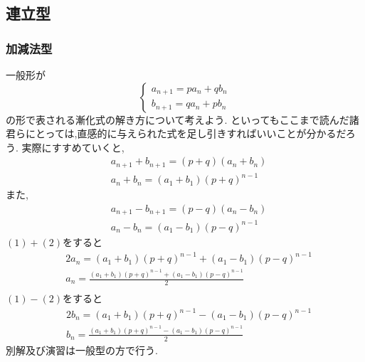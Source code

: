 
\subsection{連立型}\label{節：連立型}
  \subsubsection{加減法型}
    一般形が
    \[
      \begin{cases}
        a_{n+1}=pa_{n}+qb_{n} \\
        b_{n+1}=qa_{n}+pb_{n}
      \end{cases}
    \]
    の形で表される漸化式の解き方について考えよう.
    といってもここまで読んだ諸君らにとっては,直感的に与えられた式を足し引きすればいいことが分かるだろう.
    実際にすすめていくと,
    \begin{align*}
      &a_{n+1}+b_{n+1}=(p+q)(a_{n}+b_{n})\\
      &a_n+b_n=(a_1+b_1)(p+q)^{n-1}\tag*{\(\cdots\) (1)}
    \end{align*}
    また,
    \begin{align*}
      &a_{n+1}-b_{n+1}=(p-q)(a_{n}-b_{n})\\
      &a_n-b_n=(a_1-b_1)(p-q)^{n-1}\tag*{\(\cdots\) (2)}
    \end{align*}
    $(1)+(2)$をすると
    \begin{align*}
      &2a_n=(a_1+b_1)(p+q)^{n-1}+(a_1-b_1)(p-q)^{n-1}\\
      &a_n=\frac{(a_1+b_1)(p+q)^{n-1}+(a_1-b_1)(p-q)^{n-1}}{2}\\
    \end{align*}
    $(1)-(2)$をすると
    \begin{align*}
      &2b_n=(a_1+b_1)(p+q)^{n-1}-(a_1-b_1)(p-q)^{n-1}\\
      &b_n=\frac{(a_1+b_1)(p+q)^{n-1}-(a_1-b_1)(p-q)^{n-1}}{2}
    \end{align*}
    別解及び演習は一般型の方で行う.
